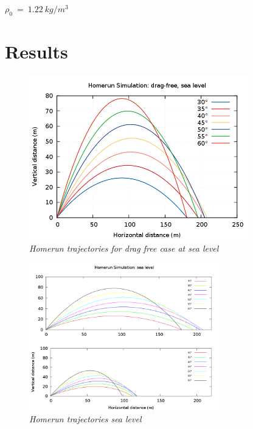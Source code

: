 \documentclass[11pt]{article}
\begin{document}
\begin{center}
$\rho_{0} ~=~ 1.22~kg/m^{3}$
\end{center}


\section{Results}

\begin{figure}[H]
  \begin{center}
\centerline{\includegraphics[width=3.75in]{drag0alt0.png}}
\caption{\it \small{Homerun trajectories for drag free case at sea level \label{fig1}}}
  \end{center}
\end{figure}

\begin{figure}[H]
  \begin{center}
\centerline{\includegraphics[width=3.25in]{fixkey2.png}}
\caption{\it \small{Homerun trajectories sea level \label{fig2}}}
  \end{center}
\end{figure}
\end{document}

